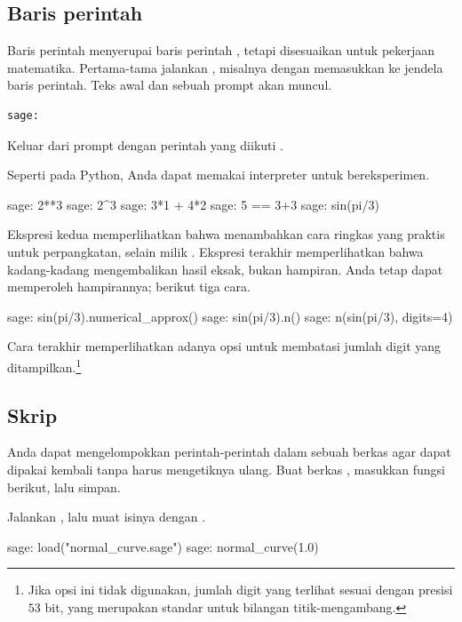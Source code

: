 \subsection{Baris perintah}
Baris perintah \Sage{} menyerupai baris perintah \python{}, tetapi disesuaikan untuk 
pekerjaan matematika.
Pertama-tama jalankan \Sage{},
misalnya dengan memasukkan  ke jendela baris perintah.
Teks awal dan sebuah prompt akan muncul.
\begin{lstlisting}[style=python]
sage:  
\end{lstlisting}
Keluar dari prompt dengan perintah 
yang diikuti .

Seperti pada Python, Anda dapat memakai interpreter untuk bereksperimen.
\begin{sagecommandline}
sage: 2**3                                                                      
sage: 2^3
sage: 3*1 + 4*2
sage: 5 == 3+3
sage: sin(pi/3)
\end{sagecommandline}
Ekspresi kedua 
memperlihatkan bahwa \Sage{} menambahkan cara ringkas yang praktis untuk perpangkatan, selain
 milik \python{}.
Ekspresi terakhir
memperlihatkan bahwa \Sage{} kadang-kadang mengembalikan hasil eksak, bukan
hampiran.
Anda tetap dapat memperoleh hampirannya; berikut tiga cara.
\begin{sagecommandline}
sage: sin(pi/3).numerical_approx()
sage: sin(pi/3).n()
sage: n(sin(pi/3), digits=4)  
\end{sagecommandline}
Cara terakhir memperlihatkan adanya opsi untuk membatasi jumlah digit
yang ditampilkan.\footnote{%
  Jika opsi ini tidak digunakan, jumlah digit yang terlihat sesuai dengan 
  presisi $53$ bit, yang merupakan standar untuk  
  bilangan titik-mengambang.}


\subsection{Skrip}
Anda dapat mengelompokkan perintah-perintah \Sage{} dalam sebuah berkas 
agar dapat dipakai kembali tanpa harus mengetiknya ulang.
Buat berkas , 
masukkan fungsi berikut, lalu simpan.

Jalankan \Sage{}, lalu muat isinya dengan .
\begin{sagecommandline}
sage: load("normal_curve.sage")
sage: normal_curve(1.0)
\end{sagecommandline}


